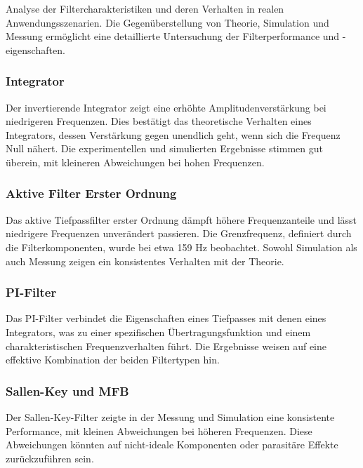 Analyse der Filtercharakteristiken und deren Verhalten in realen
Anwendungsszenarien. Die Gegenüberstellung von Theorie, Simulation und
Messung ermöglicht eine detaillierte Untersuchung der Filterperformance
und -eigenschaften.

\subsubsection{Integrator}\label{integrator}

Der invertierende Integrator zeigt eine erhöhte Amplitudenverstärkung
bei niedrigeren Frequenzen. Dies bestätigt das theoretische Verhalten
eines Integrators, dessen Verstärkung gegen unendlich geht, wenn sich
die Frequenz Null nähert. Die experimentellen und simulierten Ergebnisse
stimmen gut überein, mit kleineren Abweichungen bei hohen Frequenzen.

\subsubsection{Aktive Filter Erster
Ordnung}\label{aktive-filter-erster-ordnung}

Das aktive Tiefpassfilter erster Ordnung dämpft höhere Frequenzanteile
und lässt niedrigere Frequenzen unverändert passieren. Die
Grenzfrequenz, definiert durch die Filterkomponenten, wurde bei etwa 159
Hz beobachtet. Sowohl Simulation als auch Messung zeigen ein
konsistentes Verhalten mit der Theorie.

\subsubsection{PI-Filter}\label{pi-filter}

Das PI-Filter verbindet die Eigenschaften eines Tiefpasses mit denen
eines Integrators, was zu einer spezifischen Übertragungsfunktion und
einem charakteristischen Frequenzverhalten führt. Die Ergebnisse weisen
auf eine effektive Kombination der beiden Filtertypen hin.

\subsubsection{Sallen-Key und MFB}\label{sallen-key-und-mfb}

Der Sallen-Key-Filter zeigte in der Messung und Simulation eine
konsistente Performance, mit kleinen Abweichungen bei höheren
Frequenzen. Diese Abweichungen könnten auf nicht-ideale Komponenten oder
parasitäre Effekte zurückzuführen sein.

